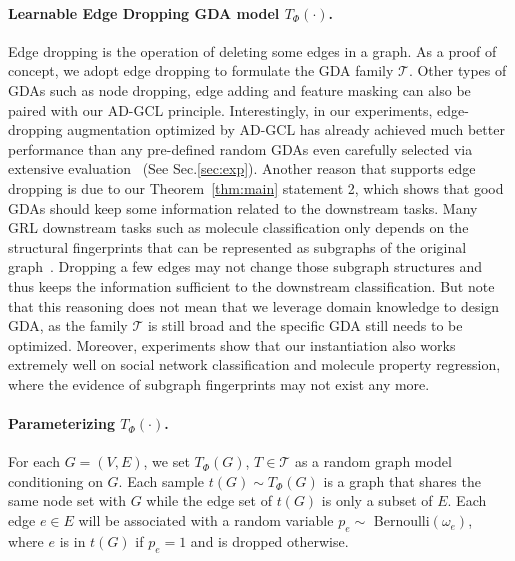 \paragraph{Learnable Edge Dropping GDA model $T_{\Phi}(\cdot)$.}
Edge dropping is the operation of deleting some edges in a graph. As a proof of concept, we adopt edge dropping to formulate the GDA family $\mathcal{T}$. Other types of GDAs such as node dropping, edge adding and feature masking can also be paired with our AD-GCL principle. %
Interestingly, in our experiments, edge-dropping augmentation optimized by AD-GCL has already achieved much better performance than any pre-defined random GDAs even carefully selected via extensive evaluation~\cite{you2020graph} (See Sec.\ref{sec:exp}). %
Another reason that supports edge dropping is due to our Theorem~\ref{thm:main} statement 2, which shows that good GDAs should keep some information related to the downstream tasks. Many GRL downstream tasks such as molecule classification only depends on the structural fingerprints that can be represented as subgraphs of the original graph~\cite{duvenaud2015convolutional}. Dropping a few edges may not change those subgraph structures %
and thus keeps the information sufficient to the downstream classification. But note that this reasoning does not mean that we leverage domain knowledge to design GDA, as the family $\mathcal{T}$ is still broad and the specific GDA still needs to be optimized. Moreover, experiments show that our instantiation also works extremely well on social network classification and molecule property regression, where the evidence of subgraph fingerprints may not exist any more.  \vspace{-1mm}

\paragraph{Parameterizing $T_{\Phi}(\cdot)$.} For each $G=(V,E)$, we set $T_{\Phi}(G)$, $T\in \mathcal{T}$ as a random graph model \cite{gilbert1959random, erdds1959random} conditioning on $G$. Each sample $t(G)\sim T_{\Phi}(G)$ is a graph that shares the same node set with $G$ while the edge set of $t(G)$ is only a subset of $E$. Each edge $e \in E$ will be associated with a random variable $p_e\sim$ Bernoulli$(\omega_e)$, where $e$ is in $t(G)$ if $p_e=1$ and is dropped otherwise. 

